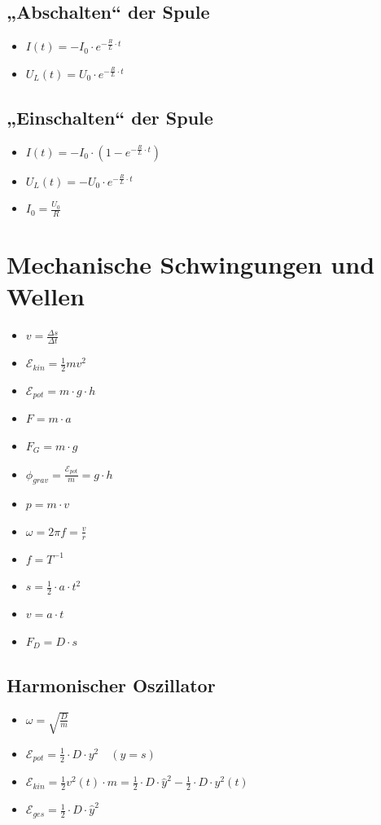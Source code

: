 \documentclass[paper = a4, twocolumn]{scrartcl}
\DeclareRobustCommand{\E}{\mathcal{E}}
\begin{document}
\subsection{„Abschalten“ der Spule}
\begin{itemize}
\item
	\( I(t) = -I_0 \cdot e^{-\frac{R}{L} \cdot t} \)
\item
	\( U_L(t) = U_0 \cdot e^{-\frac{R}{L} \cdot t} \)
\end{itemize}

\subsection{„Einschalten“ der Spule}
\begin{itemize}
\item
	\( I(t) = -I_0 \cdot (1 - e^{-\frac{R}{L} \cdot t} ) \)
\item
	\( U_L(t) = -U_0 \cdot e^{-\frac{R}{L} \cdot t} \)
\item
	\( I_0 = \frac{U_0}{R} \)
\end{itemize}

\section{Mechanische Schwingungen und Wellen}
\begin{itemize}
\item
	\( v = \frac{\Delta s}{\Delta t} \)
\item
	\( \E_{kin} = \frac{1}{2} m v^2 \)
\item
	\( \E_{pot} = m \cdot g \cdot h \)
\item
	\( F = m \cdot a \)
\item
	\( F_G = m \cdot g \)
\item
	\( \phi_{grav} = \frac{\E_{pot}}{m} = g \cdot h \)
\item
	\( p = m \cdot v \)
\item
	\( \omega = 2 \pi f = \frac{v}{r} \)
\item
	\( f = T^{-1} \)
\item
	\( s = \frac{1}{2} \cdot a \cdot t^2 \)
\item
	\( v = a \cdot t \)
\item
	\( F_D = D \cdot s \)
\end{itemize}

\subsection{Harmonischer Oszillator}
\begin{itemize}
\item
	\( \omega = \sqrt{\frac{D}{m}} \)
\item
	\( \E_{pot} = \frac{1}{2} \cdot D \cdot y^2 \quad (y = s) \)
\item
	\( \E_{kin} = \frac{1}{2} v^2(t) \cdot m = \frac{1}{2} \cdot D \cdot
	\hat{y}^2 - \frac{1}{2} \cdot D \cdot y^2(t) \)
\item
	\( \E_{ges} = \frac{1}{2} \cdot D \cdot \hat{y}^2 \)
\end{itemize}
\end{document}
